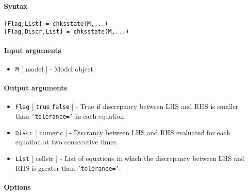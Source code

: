 


	\paragraph{Syntax}

\begin{verbatim}
[Flag,List] = chksstate(M,...)
[Flag,Discr,List] = chksstate(M,...)
\end{verbatim}

\paragraph{Input arguments}

\begin{itemize}
\itemsep1pt\parskip0pt
\item
  \texttt{M} {[} model {]} - Model object.
\end{itemize}

\paragraph{Output arguments}

\begin{itemize}
\item
  \texttt{Flag} {[} \texttt{true} \textbar{} \texttt{false} {]} - True
  if discrepancy between LHS and RHS is smaller than
  \texttt{'tolerance='} in each equation.
\item
  \texttt{Discr} {[} numeric {]} - Discrancy between LHS and RHS
  evaluated for each equation at two consecutive times.
\item
  \texttt{List} {[} cellstr {]} - List of equations in which the
  discrepancy between LHS and RHS is greater than \texttt{'tolerance='}.
\end{itemize}

\paragraph{Options}

